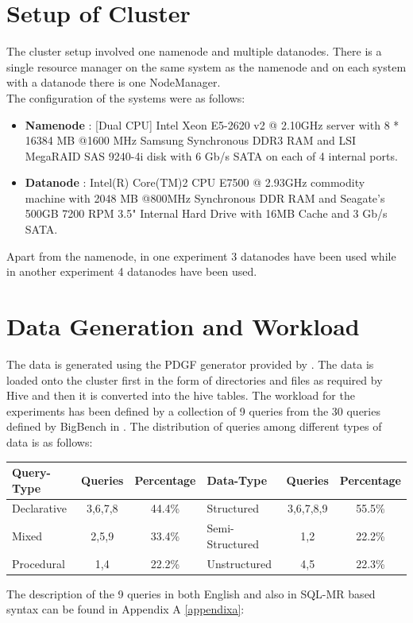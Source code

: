 \documentclass[12pt]{book}
\begin{document}
\section{Setup of Cluster}
The cluster setup involved one namenode and multiple datanodes. There is a single resource manager on the same system as the namenode
and on each system with a datanode there is one NodeManager.\\\noindent
The configuration of the systems were as follows:
\begin{itemize}
 \item \textbf{Namenode} : [Dual CPU] Intel Xeon E5-2620 v2 @ 2.10GHz server with 8 * 16384 MB @1600 MHz Samsung Synchronous DDR3 RAM and 
 LSI MegaRAID SAS 9240-4i disk with 6 Gb/s SATA on each of 4 internal ports.
 \item \textbf{Datanode} : Intel(R) Core(TM)2 CPU E7500  @ 2.93GHz commodity machine with 2048 MB @800MHz Synchronous DDR RAM and Seagate's
 500GB 7200 RPM 3.5" Internal Hard Drive with 16MB Cache and 3 Gb/s SATA.
\end{itemize}
Apart from the namenode, in one experiment 3 datanodes have been used while in another experiment 4 datanodes have been used.
\section{Data Generation and Workload}
The data is generated using the PDGF generator provided by \cite{bigbenchgit} . The data is loaded onto the cluster first in the form of
directories and files as required by Hive and then it is converted into the hive tables.
The workload for the experiments has been defined by a collection of 9 queries from the 30 queries defined by BigBench in \cite{springer} .
The distribution of queries among different types of data is as follows:
\begin{center}
\begin{tabular}{|l|c|c||l|c|c|}\hline
Query-Type & Queries & Percentage & Data-Type & Queries & Percentage\\\hline
\multirow{2}{*}{Declarative} & \multirow{2}{*}{3,6,7,8} & \multirow{2}{*}{44.4\%} & \multirow{2}{*}{Structured} & \multirow{2}{*}{3,6,7,8,9} & \multirow{2}{*}{55.5\%}\\
& & & & & \\\hline
\multirow{2}{*}{Mixed} & \multirow{2}{*}{2,5,9} & \multirow{2}{*}{33.4\%} & \multirow{2}{*}{Semi-Structured} & \multirow{2}{*}{1,2} & \multirow{2}{*}{22.2\%}\\
& & & & & \\\hline
\multirow{2}{*}{Procedural} & \multirow{2}{*}{1,4} & \multirow{2}{*}{22.2\%} & \multirow{2}{*}{Unstructured} & \multirow{2}{*}{4,5} & \multirow{2}{*}{22.3\%}\\
& & & & & \\\hline
\end{tabular}
\end{center}
The description of the 9 queries in both English and also in SQL-MR based syntax can be found in Appendix A \ref{appendixa}:
\end{document}
